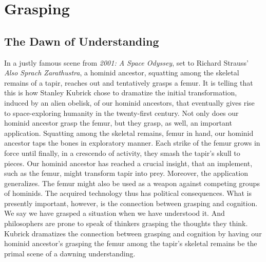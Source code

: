
\chapter{Grasping} %
\label{cha:grasping}


\section{The Dawn of Understanding} %
\label{sec:grasping_and_the_dawn_of_understanding}

In a justly famous scene from \emph{2001: A Space Odyssey}, set to Richard Strauss' \emph{Also Sprach Zarathustra}, a hominid ancestor, squatting among the skeletal remains of a tapir, reaches out and tentatively grasps a femur. It is telling that this is how Stanley Kubrick chose to dramatize the initial transformation, induced by an alien obelisk, of our hominid ancestors, that eventually gives rise to space-exploring humanity in the twenty-first century. Not only does our hominid ancestor grasp the femur, but they grasp, as well, an important application. Squatting among the skeletal remains, femur in hand, our hominid ancestor taps the bones in exploratory manner. Each strike of the femur grows in force until finally, in a crescendo of activity, they smash the tapir's skull to pieces. Our hominid ancestor has reached a crucial insight, that an implement, such as the femur, might transform tapir into prey. Moreover, the application generalizes. The femur might also be used as a weapon against competing groups of hominids. The acquired technology thus has political consequences. What is presently important, however, is the connection between grasping and cognition. We say we have grasped a situation when we have understood it. And philosophers are prone to speak of thinkers grasping the thoughts they think. Kubrick dramatizes the connection between grasping and cognition by having our hominid ancestor's grasping the femur among the tapir's skeletal remains be the primal scene of a dawning understanding.

